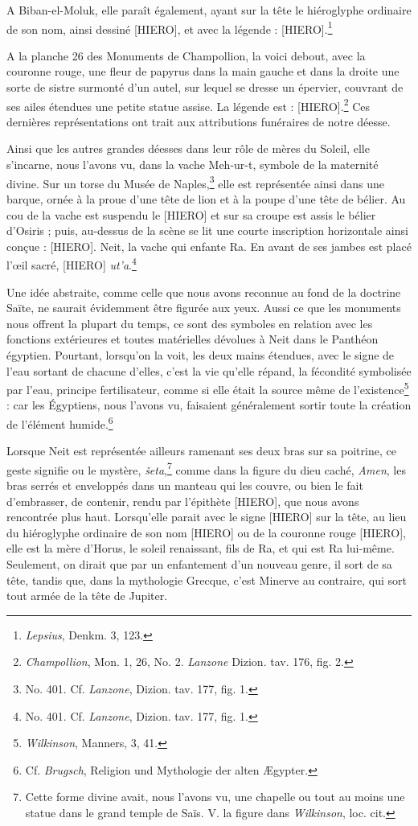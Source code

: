 \documentclass[a4paper, 11pt, oneside]{article}
\begin{document}
A Biban-el-Moluk, elle paraît également, ayant sur la tête le hiéroglyphe ordinaire de son nom, ainsi dessiné [HIERO], et avec la légende : [HIERO].\footnote{\emph{Lepsius}, Denkm. 3, 123.}

A la planche 26 des Monuments de Champollion, la voici debout, avec la couronne rouge, une fleur de papyrus dans la main gauche et dans la droite une sorte de sistre surmonté d'un autel, sur lequel se dresse un épervier, couvrant de ses ailes étendues une petite statue assise. La légende est : [HIERO].\footnote{\emph{Champollion}, Mon. 1, 26, No. 2. \emph{Lanzone} Dizion. tav. 176, fig. 2.} Ces dernières représentations ont trait aux attributions funéraires de notre déesse.

Ainsi que les autres grandes déesses dans leur rôle de mères du Soleil, elle s'incarne, nous l'avons vu, dans la vache Meh-ur-t, symbole de la maternité divine. Sur un torse du Musée de Naples,\footnote{No. 401. Cf. \emph{Lanzone}, Dizion. tav. 177, fig. 1.} elle est représentée ainsi dans une barque, ornée à la proue d'une tête de lion et à la poupe d'une tête de bélier. Au cou de la vache est suspendu le [HIERO] et sur sa croupe est assis le bélier d'Osiris ; puis, au-dessus de la scène se lit une courte inscription horizontale ainsi conçue : [HIERO]. Neit, la vache qui enfante Ra. En avant de ses jambes est placé l'œil sacré, [HIERO] \emph{ut'a}.\footnote{No. 401. Cf. \emph{Lanzone}, Dizion. tav. 177, fig. 1.}

Une idée abstraite, comme celle que nous avons reconnue au fond de la doctrine Saïte, ne saurait évidemment être figurée aux yeux. Aussi ce que les monuments nous offrent la plupart du temps, ce sont des symboles en relation avec les fonctions extérieures et toutes matérielles dévolues à Neit dans le Panthéon égyptien. Pourtant, lorsqu'on la voit, les deux mains étendues, avec le signe de l'eau sortant de chacune d'elles, c'est la vie qu'elle répand, la fécondité symbolisée par l'eau, principe fertilisateur, comme si elle était la source même de l'existence\footnote{\emph{Wilkinson}, Manners, 3, 41.} : car les Égyptiens, nous l'avons vu, faisaient généralement sortir toute la création de l'élément humide.\footnote{Cf. \emph{Brugsch}, Religion und Mythologie der alten Ægypter.}

Lorsque Neit est représentée ailleurs ramenant ses deux bras sur sa poitrine, ce geste signifie ou le mystère, \emph{šeta},\footnote{Cette forme divine avait, nous l'avons vu, une chapelle ou tout au moins une statue dans le grand temple de Saïs. V. la figure dans \emph{Wilkinson}, loc. cit.} comme dans la figure du dieu caché, \emph{Amen}, les bras serrés et enveloppés dans un manteau qui les couvre, ou bien le fait d'embrasser, de contenir, rendu par l'épithète [HIERO], que nous avons rencontrée plus haut. Lorsqu'elle parait avec le signe [HIERO] sur la tête, au lieu du hiéroglyphe ordinaire de son nom [HIERO] ou de la couronne rouge [HIERO], elle est la mère d'Horus, le soleil renaissant, fils de Ra, et qui est Ra lui-même. Seulement, on dirait que par un enfantement d'un nouveau genre, il sort de sa tête, tandis que, dans la mythologie Grecque, c'est Minerve au contraire, qui sort tout armée de la tête de Jupiter.
\end{document}
